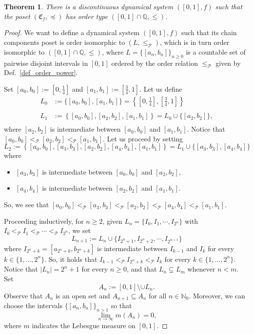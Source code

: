 \documentclass[10pt,a4paper]{amsart}
\newtheorem{thm}{Theorem}
\begin{document}
\begin{thm}\label{order_type_[0,1]}
There is a discontinuous dynamical system $([0,1],f)$ such that the poset $(\mathfrak{C}_f,\preceq)$ has order type $([0,1]\cap\mathbb{Q},\le)$.
\end{thm}

\begin{proof}
We want to define a dynamical system $([0,1],f)$ such that its chain components poset is order isomorphic to $(L,\leq_{\mathcal{P}})$, which is in turn order isomorphic to $([0,1]\cap \mathbb{Q}, \leq)$, where $L=\{[a_n,b_n]\}_{n\geq 0}$ is a countable set of pairwise disjoint intervals in $[0,1]$ ordered by the order relation $\leq_{\mathcal{P}}$ given by Def.~\ref{def_order_power}.

\noindent Set $[a_0,b_0]:=\left[0,\frac{1}{4}\right]$ and $[a_1,b_1]:=\left[\frac{3}{4},1\right]$. 
Let us define
\begin{align*}
L_0&:=\{[a_0,b_0],[a_1,b_1]\}=\left \{\left[0,\frac{1}{4}\right], \left[\frac{3}{4},1\right]\right \}\\
\\
L_1&:=\left\{[a_0,b_0], \left[a_2, b_2\right], [a_1,b_1]\right\}=L_0\cup\{[a_2,b_2]\},\\
\end{align*}
where $[a_2,b_2]$ is intermediate between $[a_0,b_0]$ and $[a_1,b_1]$. Notice that $[a_0,b_0] <_\mathcal{P} [a_2,b_2]<_\mathcal{P} [a_1,b_1]$.
Let us proceed by setting
\[
L_2:=\left\{[a_0,b_0],[a_3, b_3], [a_2,b_2],[a_4,b_4],[a_1,b_1]\right\}=L_1\cup\{[a_3,b_3],[a_4,b_4]\}
\]
where 
\begin{itemize}
\item $[a_3,b_3]$ is intermediate between $[a_0,b_0]$ and $[a_2,b_2]$, 
\item $[a_4,b_4]$ is intermediate between $[a_2,b_2]$ and $[a_1,b_1]$.
\end{itemize}
So, we see that $[a_0,b_0]<_\mathcal{P}[a_3,b_3]  <_\mathcal{P} [a_2,b_2]<_\mathcal{P}[a_4,b_4]<_\mathcal{P} [a_1,b_1]$.

\noindent Proceeding inductively, for $n\ge 2$, given $L_n=\{I_0, I_1,\cdots , I_{2^n}\}$ with $I_0<_\mathcal{P} I_1<_\mathcal{P}\cdots <_\mathcal{P} I_{2^n}$, we set
\[
L_{n+1}:=L_n\cup\{I_{2^n+1}, I_{2^n+2},\cdots , I_{2^{n+1}}\}
\]
where $I_{2^n+k}=[a_{2^n+k}, b_{2^n+k}]$ is intermediate between $I_{k-1}$ and $I_{k}$ for every $k\in\{1,\ldots,2^n\}$.
So, it holds that $I_{k-1} <_\mathcal{P} I_{2^n+k} <_\mathcal{P} I_k$ for every $k\in\{1,\ldots,2^n\}$.
Notice that $\left|L_n\right|=2^n+1$ for every $n\geq 0$, and that $L_n\subsetneq L_m$ whenever $n<m$.
Set 
$$
A_n:=[0,1]\setminus \cup L_n.
$$ 
Observe that $A_n$ is an open set and $A_{n+1}\subseteq A_{n}$ for all $n\in\mathbb{N}_0$. Moreover, we can choose the intervals $\{[a_n,b_n]\}_{n>1}$ so that 
\begin{equation}\label{eq_mis_compl}
    \lim_{n\to\infty} m(A_n)=0,
\end{equation}
where $m$ indicates the Lebesgue measure on $[0,1]$.


\end{proof}
\end{document}

